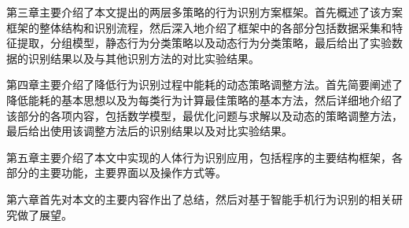 \par 第三章主要介绍了本文提出的两层多策略的行为识别方案框架。首先概述了该方案框架的整体结构和识别流程，然后深入地介绍了框架中的各部分包括数据采集和特征提取，分组模型，静态行为分类策略以及动态行为分类策略，最后给出了实验数据的识别结果以及与其他识别方法的对比实验结果。

\par 第四章主要介绍了降低行为识别过程中能耗的动态策略调整方法。首先简要阐述了降低能耗的基本思想以及为每类行为计算最佳策略的基本方法，然后详细地介绍了该部分的各项内容，包括数学模型，最优化问题与求解以及动态的策略调整方法，最后给出使用该调整方法后的识别结果以及对比实验结果。

\par 第五章主要介绍了本文中实现的人体行为识别应用，包括程序的主要结构框架，各部分的主要功能，主要界面以及操作方式等。

\par 第六章首先对本文的主要内容作出了总结，然后对基于智能手机行为识别的相关研究做了展望。
